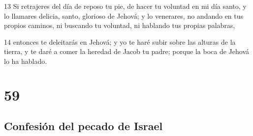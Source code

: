 \par 13 Si retrajeres del día de reposo tu pie, de hacer tu voluntad en mi día santo, y lo llamares delicia, santo, glorioso de Jehová; y lo venerares, no andando en tus propios caminos, ni buscando tu voluntad, ni hablando tus propias palabras,
\par 14 entonces te deleitarás en Jehová; y yo te haré subir sobre las alturas de la tierra, y te daré a comer la heredad de Jacob tu padre; porque la boca de Jehová lo ha hablado.

\chapter{59}

\section*{Confesión del pecado de Israel}

